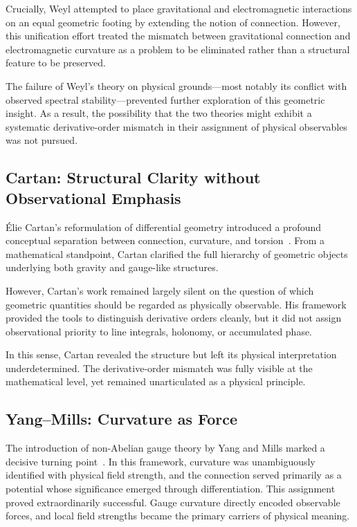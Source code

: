 \documentclass[12pt,letterpaper]{article}
\begin{document}
Crucially, Weyl attempted to place gravitational and electromagnetic interactions on an equal geometric footing by extending the notion of connection. However, this unification effort treated the mismatch between gravitational connection and electromagnetic curvature as a problem to be eliminated rather than a structural feature to be preserved.

The failure of Weyl's theory on physical grounds---most notably its conflict with observed spectral stability---prevented further exploration of this geometric insight. As a result, the possibility that the two theories might exhibit a systematic derivative-order mismatch in their assignment of physical observables was not pursued.

\subsection{Cartan: Structural Clarity without Observational Emphasis}

\justifying
\'Elie Cartan's reformulation of differential geometry introduced a profound conceptual separation between connection, curvature, and torsion~\cite{Cartan1923}. From a mathematical standpoint, Cartan clarified the full hierarchy of geometric objects underlying both gravity and gauge-like structures.

However, Cartan's work remained largely silent on the question of which geometric quantities should be regarded as physically observable. His framework provided the tools to distinguish derivative orders cleanly, but it did not assign observational priority to line integrals, holonomy, or accumulated phase.

In this sense, Cartan revealed the structure but left its physical interpretation underdetermined. The derivative-order mismatch was fully visible at the mathematical level, yet remained unarticulated as a physical principle.

\subsection{Yang--Mills: Curvature as Force}

\justifying
The introduction of non-Abelian gauge theory by Yang and Mills marked a decisive turning point~\cite{YangMills1954}. In this framework, curvature was unambiguously identified with physical field strength, and the connection served primarily as a potential whose significance emerged through differentiation. This assignment proved extraordinarily successful. Gauge curvature directly encoded observable forces, and local field strengths became the primary carriers of physical meaning.
\end{document}
